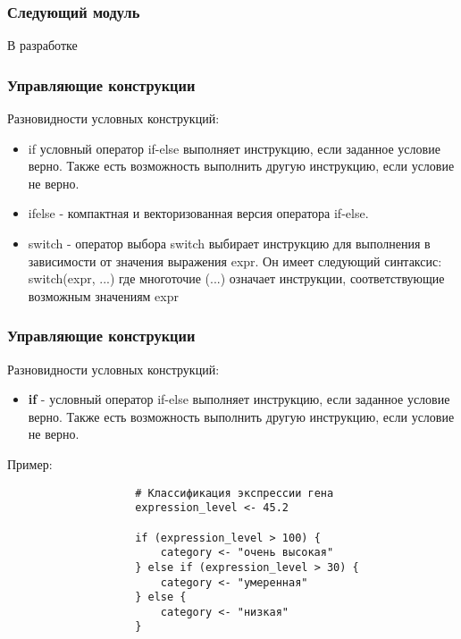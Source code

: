 \documentclass[10pt]{beamer}
\begin{document}
	
	\begin{frame}[fragile]
		\frametitle{Следующий модуль}
		В разработке
	\end{frame}
	
	
	\begin{frame}
		\frametitle{Управляющие конструкции}
		Разновидности условных конструкций:
		\begin{itemize}
			\item if условный оператор if-else выполняет инструкцию, если заданное условие верно. Также есть возможность выполнить другую инструкцию, если условие не верно.
			
			\item ifelse - компактная и векторизованная версия оператора if-else.
			
			\item switch - оператор выбора switch выбирает инструкцию для выполнения в зависимости от значения выражения expr. Он имеет следующий синтаксис: switch(expr, ...) где многоточие (...) означает инструкции, соответствующие возможным значениям expr
		\end{itemize}
	\end{frame}	
	
	\begin{frame}[fragile]
		\frametitle{Управляющие конструкции}
		Разновидности условных конструкций:
		\begin{itemize}
			\item \textbf{if} - условный оператор if-else выполняет инструкцию, если заданное условие верно. Также есть возможность выполнить другую инструкцию, если условие не верно.
		\end{itemize}
		
		\begin{exampleblock}{Пример:}
			{\footnotesize
				\begin{verbatim}
					# Классификация экспрессии гена
					expression_level <- 45.2
					
					if (expression_level > 100) {
						category <- "очень высокая"
					} else if (expression_level > 30) {
						category <- "умеренная"
					} else {
						category <- "низкая"
					}
					
				\end{verbatim}
			}
		\end{exampleblock}
	\end{frame}
	
\end{document}
